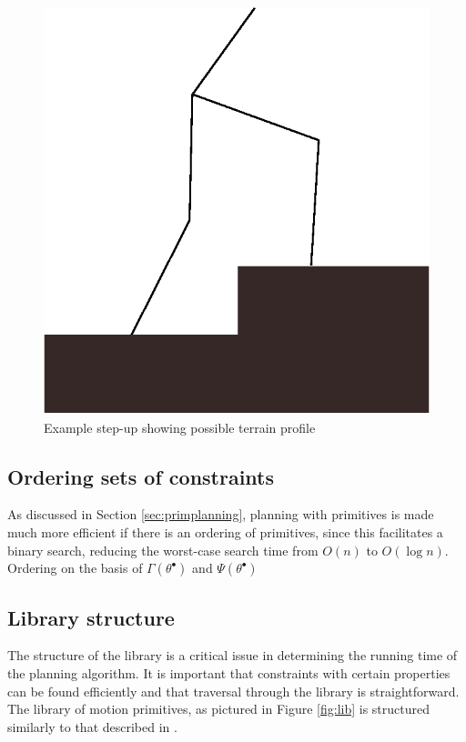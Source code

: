 \begin{figure}
	\centering
	\includegraphics[width=0.5\linewidth]{4VirtConstLib/stepup.eps}
	\caption{Example step-up showing possible terrain profile}
	\label{fig:stepup}
\end{figure}

\subsection{Ordering sets of constraints} \label{sec:orderings}
As discussed in Section \ref{sec:primplanning}, planning with primitives is made much more efficient if there is an ordering of primitives, since this facilitates a binary search, reducing the worst-case search time from $O(n)$ to $O(\log n)$. Ordering on the basis of $\Gamma(\theta^\bullet)$ and $\Psi(\theta^\bullet)$

\subsection{Library structure}
The structure of the library is a critical issue in determining the running time of the planning algorithm. It is important that constraints with certain properties can be found efficiently and that traversal through the library is straightforward. The library of motion primitives, as pictured in Figure \ref{fig:lib} is structured similarly to that described in \cite{manchester13planning}.

